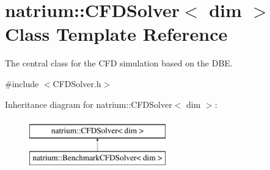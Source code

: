 \hypertarget{classnatrium_1_1CFDSolver}{\section{natrium\-:\-:C\-F\-D\-Solver$<$ dim $>$ Class Template Reference}
\label{classnatrium_1_1CFDSolver}
}


The central class for the C\-F\-D simulation based on the D\-B\-E.  




{\ttfamily \#include $<$C\-F\-D\-Solver.\-h$>$}

Inheritance diagram for natrium\-:\-:C\-F\-D\-Solver$<$ dim $>$\-:\begin{figure}[H]
\begin{center}
\leavevmode
\includegraphics[height=2.000000cm]{classnatrium_1_1CFDSolver}
\end{center}
\end{figure}
